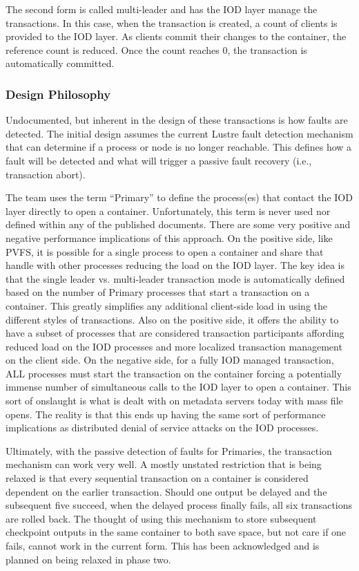 \documentclass[conference]{IEEEtran}
\begin{document}
The second form is called multi-leader and has the IOD layer manage the
transactions. In this case, when the transaction is created, a count of clients
is provided to the IOD layer. As clients commit their changes to the container,
the reference count is reduced. Once the count reaches 0, the transaction is
automatically committed.

\subsubsection{Design Philosophy}
Undocumented, but inherent in the design of these transactions is how faults
are detected. The initial design assumes the current Lustre fault detection
mechanism that can determine if a process or node is no longer reachable. This
defines how a fault will be detected and what will trigger a passive fault
recovery (i.e., transaction abort).

The team uses the term ``Primary'' to define the process(es) that contact the
IOD layer directly to open a container. Unfortunately, this term is never used
nor defined within any of the published documents. There are some very positive
and negative performance implications of this approach. On the positive side,
like PVFS, it is possible for a single process to open a container and share
that handle with other processes reducing the load on the IOD layer. The key
idea is that the single leader vs. multi-leader transaction mode is
automatically defined based on the number of Primary processes that start a
transaction on a container. This greatly simplifies any additional client-side
load in using the different styles of transactions. Also on the positive side,
it offers the ability to have a subset of processes that are considered
transaction participants affording reduced load on the IOD processes and more
localized transaction management on the client side. On the negative side, for
a fully IOD managed transaction, ALL processes must start the transaction on
the container forcing a potentially immense number of simultaneous calls to the
IOD layer to open a container. This sort of onslaught is what is dealt with on
metadata servers today with mass file opens. The reality is that this ends up
having the same sort of performance implications as distributed denial of
service attacks on the IOD processes.

Ultimately, with the passive detection of faults for Primaries, the transaction
mechanism can work very well. A mostly unstated restriction that is being
relaxed is that every sequential transaction on a container is considered
dependent on the earlier transaction. Should one output be delayed and the
subsequent five succeed, when the delayed process finally fails, all six
transactions are rolled back. The thought of using this mechanism to store
subsequent checkpoint outputs in the same container to both save space, but not
care if one fails, cannot work in the current form. This has been acknowledged
and is planned on being relaxed in phase two.
\end{document}
